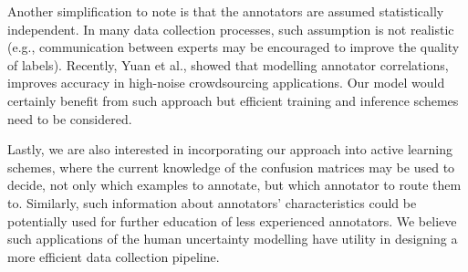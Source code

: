 Another simplification to note is that the annotators are assumed statistically independent. In many data collection processes, such assumption is not realistic (e.g., communication between experts may be encouraged to improve the quality of labels). Recently, Yuan et al., \cite{li2019exploiting} showed that modelling annotator correlations,  improves accuracy in high-noise crowdsourcing applications. Our model would certainly benefit from such approach but efficient training and inference schemes need to be considered. 

Lastly, we are also interested in incorporating our approach into active learning schemes, where the current knowledge of the confusion matrices may be used to decide, not only which examples to annotate, but which annotator to route them to. Similarly, such information about annotators' characteristics could be potentially used for further education of less experienced annotators. We believe such applications of the human uncertainty modelling have utility in designing a more efficient data collection pipeline. 



